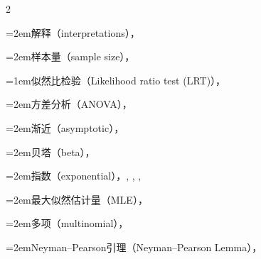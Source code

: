 \begin{multicols}{2}
\par\noindent\hangindent=2em\hspace*{1em}\label{idx:628}解释（interpretations），\hyperref[ex:6.3.7]{\pageref*{ex:6.3.7}}\par
\par\noindent\hangindent=2em\hspace*{1em}\label{idx:629}样本量（sample size），\hyperref[exercise:6.34]{\pageref*{exercise:6.34}}\par
\par\addvspace{2pt}
\par\noindent\hangindent=1em\hspace*{0em}\label{idx:630}似然比检验（Likelihood ratio test (LRT)），\hyperref[def:8.2.1]{\pageref*{def:8.2.1}}\par
\par\noindent\hangindent=2em\hspace*{1em}\label{idx:631}方差分析（ANOVA），\hyperref[exercise:11.13]{\pageref*{exercise:11.13}}\par
\par\noindent\hangindent=2em\hspace*{1em}\label{idx:632}渐近（asymptotic），\hyperref[thm:10.3.3]{\pageref*{thm:10.3.3}}\par
\par\noindent\hangindent=2em\hspace*{1em}\label{idx:633}贝塔（beta），\hyperref[exercise:8.17]{\pageref*{exercise:8.17}}\par
\par\noindent\hangindent=2em\hspace*{1em}\label{idx:634}指数（exponential），\hyperref[ex:8.2.3]{\pageref*{ex:8.2.3}}, \hyperref[ex:8.2.5]{\pageref*{ex:8.2.5}}, \hyperref[ex:8.3.7]{\pageref*{ex:8.3.7}}, \hyperref[exercise:8.6]{\pageref*{exercise:8.6}}\par
\par\noindent\hangindent=2em\hspace*{1em}\label{idx:635}最大似然估计量（MLE），\hyperref[idxocc:635:335]{\pageref*{idxocc:635:335}}\par
\par\noindent\hangindent=2em\hspace*{1em}\label{idx:636}多项（multinomial），\hyperref[ex:10.3.4]{\pageref*{ex:10.3.4}}\par
\par\noindent\hangindent=2em\hspace*{1em}\label{idx:637}Neyman–Pearson引理（Neyman–Pearson Lemma），\hyperref[exercise:8.24]{\pageref*{exercise:8.24}}\par

\end{multicols}
